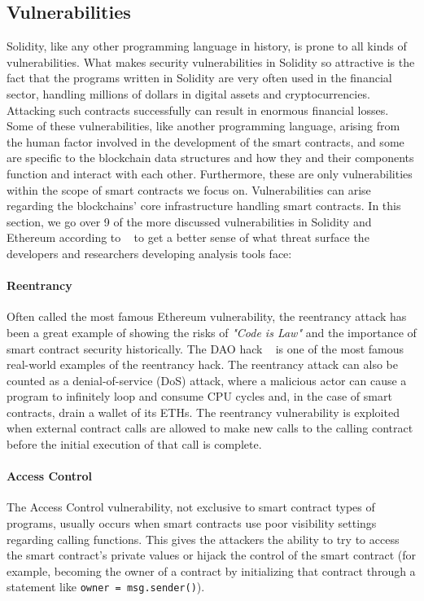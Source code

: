     \subsection{Vulnerabilities}
        Solidity, like any other programming language in history, is prone to all kinds of vulnerabilities.
        What makes security vulnerabilities in Solidity so attractive is the fact that the programs written in Solidity are very often used in the financial sector,
        handling millions of dollars in digital assets and cryptocurrencies. Attacking such contracts successfully can result in enormous financial losses.
        Some of these vulnerabilities, like another programming language, arising from the human factor involved in the development of the smart contracts, and some are specific to the blockchain data structures and how they and their components function and interact with each other.
        Furthermore, these are only vulnerabilities within the scope of smart contracts we focus on. Vulnerabilities can arise regarding the blockchains' core infrastructure handling smart contracts.
        In this section, we go over 9 of the more discussed vulnerabilities in Solidity and Ethereum according to ~\cite{dasp} to get a better sense of what threat surface the developers and researchers developing analysis tools face:

            \paragraph{Reentrancy}
            Often called the most famous Ethereum vulnerability, the reentrancy attack has been a great example of showing the risks of \textit{"Code is Law"} and the importance of smart contract security historically.
            The DAO hack ~\cite{dhillon2017dao} is one of the most famous real-world examples of the reentrancy hack.
            The reentrancy attack can also be counted as a denial-of-service (DoS) attack, where a malicious actor can cause a program to infinitely loop and consume CPU cycles and, in the case of smart contracts, drain a wallet of its ETHs.
            The reentrancy vulnerability is exploited when external contract calls are allowed to make new calls to the calling contract before the initial execution of that call is complete.~\cite{dasp}

            \paragraph{Access Control}
            The Access Control vulnerability, not exclusive to smart contract types of programs, usually occurs when smart contracts use poor visibility settings regarding calling functions.
            This gives the attackers the ability to try to access the smart contract's private values or hijack the control of the smart contract (for example, becoming the owner of a contract by initializing that contract through a statement like \texttt{owner = msg.sender()}).

